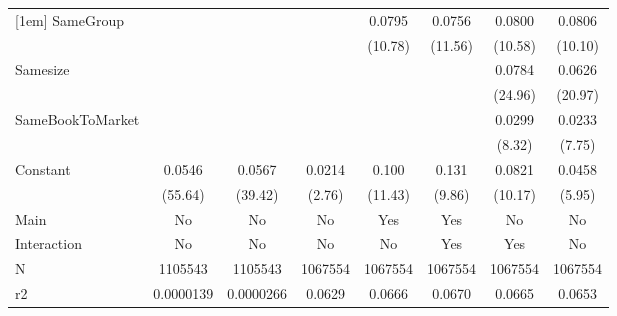 {\begin{tabular}{l*{7}{c}}
[1em]
SameGroup           &                     &                     &                     &      0.0795\sym{***}&      0.0756\sym{***}&      0.0800\sym{***}&      0.0806\sym{***}\\
                    &                     &                     &                     &     (10.78)         &     (11.56)         &     (10.58)         &     (10.10)         \\
[1em]
Samesize            &                     &                     &                     &                     &                     &      0.0784\sym{***}&      0.0626\sym{***}\\
                    &                     &                     &                     &                     &                     &     (24.96)         &     (20.97)         \\
[1em]
SameBookToMarket    &                     &                     &                     &                     &                     &      0.0299\sym{***}&      0.0233\sym{***}\\
                    &                     &                     &                     &                     &                     &      (8.32)         &      (7.75)         \\
[1em]
Constant            &      0.0546\sym{***}&      0.0567\sym{***}&      0.0214\sym{**} &       0.100\sym{***}&       0.131\sym{***}&      0.0821\sym{***}&      0.0458\sym{***}\\
                    &     (55.64)         &     (39.42)         &      (2.76)         &     (11.43)         &      (9.86)         &     (10.17)         &      (5.95)         \\
\hline
Main                &          No         &          No         &          No         &         Yes         &         Yes         &          No         &          No         \\
Interaction         &          No         &          No         &          No         &          No         &         Yes         &         Yes         &          No         \\
N                   &     1105543         &     1105543         &     1067554         &     1067554         &     1067554         &     1067554         &     1067554         \\
r2                  &   0.0000139         &   0.0000266         &      0.0629         &      0.0666         &      0.0670         &      0.0665         &      0.0653         \\

\end{tabular}}

